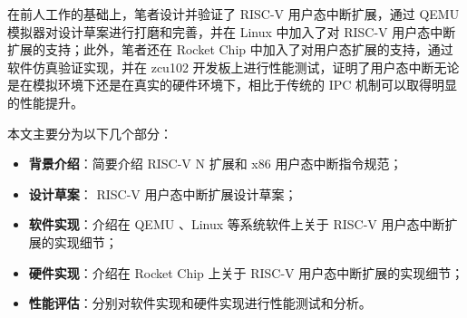 在前人工作的基础上，笔者设计并验证了 RISC-V 用户态中断扩展，通过 QEMU 模拟器对设计草案进行打磨和完善，并在 Linux 中加入了对 RISC-V 用户态中断扩展的支持；此外，笔者还在 Rocket Chip 中加入了对用户态扩展的支持，通过软件仿真验证实现，并在 zcu102 开发板上进行性能测试，证明了用户态中断无论是在模拟环境下还是在真实的硬件环境下，相比于传统的 IPC 机制可以取得明显的性能提升。

本文主要分为以下几个部分：

\begin{itemize}
    \item \textbf{背景介绍}：简要介绍 RISC-V N 扩展和 x86 用户态中断指令规范；
    \item \textbf{设计草案}： RISC-V 用户态中断扩展设计草案；
    \item \textbf{软件实现}：介绍在 QEMU 、Linux 等系统软件上关于 RISC-V 用户态中断扩展的实现细节；
    \item \textbf{硬件实现}：介绍在 Rocket Chip 上关于 RISC-V 用户态中断扩展的实现细节；
    \item \textbf{性能评估}：分别对软件实现和硬件实现进行性能测试和分析。
\end{itemize}